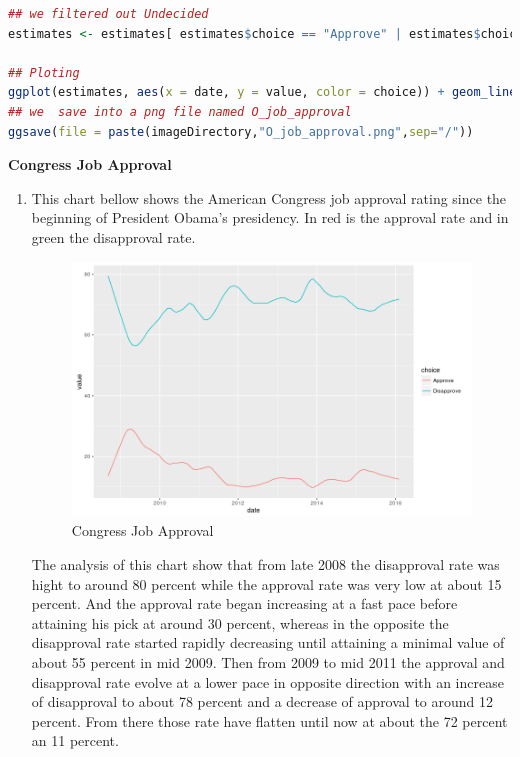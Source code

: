 \documentclass{article}[14pt]
\begin{document}
\begin{section}
\begin{enumerate}[]
\begin{lstlisting}[language = R]
## we filtered out Undecided
estimates <- estimates[ estimates$choice == "Approve" | estimates$choice == "Disapprove",]

## Ploting 
ggplot(estimates, aes(x = date, y = value, color = choice)) + geom_line()
## we  save into a png file named O_job_approval
ggsave(file = paste(imageDirectory,"O_job_approval.png",sep="/"))
\end{lstlisting}

\end{enumerate}
 
\bigskip
\end{section}

\begin{section}
{\bf \large Congress Job Approval}
\begin{enumerate}[]
\item {} %

This chart bellow shows the American Congress job approval rating since the beginning of President Obama's presidency. In red is the approval rate and in green the disapproval rate.

\begin{figure}[h]
\begin{center}
\includegraphics[width=\linewidth]{Congressjobapp}
\end{center}
\caption{Congress Job Approval}
\label{fig:figure 5}
\end{figure}

The analysis of this chart show that from late 2008 the disapproval rate was hight to around 80 percent while the approval rate was very low at about 15 percent. And the approval rate began increasing at a fast pace before attaining his pick at around 30 percent, whereas in the opposite  the disapproval rate started  rapidly decreasing  until attaining a minimal  value of about 55 percent in mid 2009. Then from  2009 to mid 2011 the approval and disapproval rate evolve at a lower pace in opposite direction with an increase of disapproval to about 78 percent and a decrease of approval to around 12 percent. From there those rate have flatten until  now at about the 72 percent an 11 percent.


\end{enumerate}
\end{section}
\end{document}
